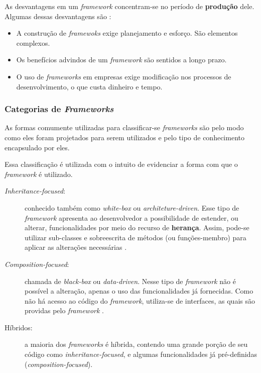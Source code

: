 As desvantagens em um \textit{framework} concentram-se no período de
\textbf{produção} dele. Algumas dessas desvantagens são \cite{barretoJunior2006}
\cite{sauve2006}:
\begin{itemize}
\item A construção de \textit{framewoks} exige planejamento e esforço. São
elementos complexos.
\item Os benefícios advindos de um \textit{framework} são sentidos a longo prazo.
\item O uso de \textit{frameworks} em empresas exige modificação nos processos de
desenvolvimento, o que custa dinheiro e tempo.
\end{itemize}
\par

\subsubsection{Categorias de \textit{Frameworks}}
As formas comumente utilizadas para classificar-se \textit{frameworks} são pelo
modo como eles foram projetados para serem utilizados e pelo tipo de conhecimento
encapsulado por eles.

Essa classificação é utilizada com o intuito de evidenciar a forma com que o
\textit{framework} é utilizado.
\begin{description}
\item[\textit{Inheritance-focused}:] conhecido também como \textit{white-box} ou
\textit{architeture-driven}. Esse tipo de \textit{framework} apresenta ao
desenvolvedor a possibilidade de estender, ou alterar, funcionalidades por meio
do recurso de \textbf{herança}. Assim, pode-se utilizar sub-classes e
sobreescrita de métodos (ou funções-membro) para aplicar as alterações necessárias
\cite{sauve2006}.
\item[\textit{Composition-focused}:] chamada de \textit{black-box} ou \textit{data-driven}.
Nesse tipo de \textit{framework}  não é possível a alteração, apenas o uso das
funcionalidades já fornecidas. Como não há acesso ao código do \textit{framework},
utiliza-se de interfaces, as quais são providas pelo \textit{framework} \cite{sauve2006}.
\item[Híbridos:] a maioria dos \textit{frameworks} é híbrida, contendo uma
grande porção de seu código como \textit{inheritance-focused}, e algumas
funcionalidades já pré-definidas (\textit{composition-focused}).
\end{description}

